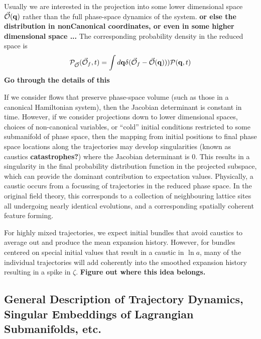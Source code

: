 Usually we are interested in the projection into some lower dimensional space $\vec{\mathcal{O}}({\bf q})$ rather than the full phase-space dynamics of the system.
{\bf or else the distribution in nonCanonical coordinates, or even in some higher dimensional space ...}
The corresponding probability density in the reduced space is
\begin{equation}
  \mathcal{P}_{\vec{\mathcal{O}}}(\vec{\mathcal{O}}_f,t) = \int d{\bf q} \delta(\vec{\mathcal{O}}_f-\vec{\mathcal{O}}({\bf q}))) \mathcal{P}({\bf q},t)
\end{equation}
{\bf Go through the details of this}

If we consider flows that preserve phase-space volume (such as those in a canonical Hamiltonian system), then the Jacobian determinant is constant in time.
However, if we consider projections down to lower dimensional spaces, choices of non-canonical variables, or ``cold'' initial conditions restricted to some submanifold of phase space,
then the mapping from initial positions to final phase space locations along the trajectories may develop singularities (known as caustics {\bf catastrophes?}) where the Jacobian determinant is $0$.  This results in a singularity in the final probability distribution function in the projected subspace, which can provide the dominant contribution to expectation values.
Physically, a caustic occurs from a focussing of trajectories in the reduced phase space.  In the original field theory, this corresponds to a collection of neighbouring lattice sites all undergoing nearly identical evolutions, and a corresponding spatially coherent feature forming.

For highly mixed trajectories, we expect initial bundles that avoid caustics to average out and produce the mean expansion history.  However, for bundles centered on special initial values that result in a caustic in $\ln a$, many of the individual trajectories will add coherently into the smoothed expansion history resulting in a spike in $\zeta$. {\bf Figure out where this idea belongs.}

\subsection{General Description of Trajectory Dynamics, Singular Embeddings of Lagrangian Submanifolds, etc.}

